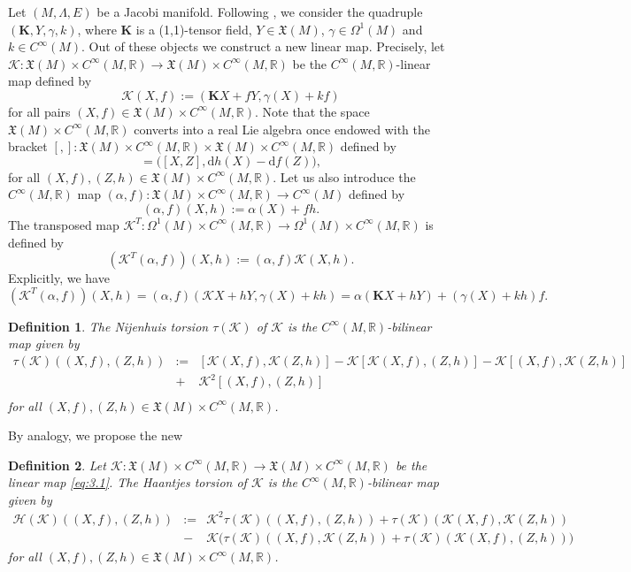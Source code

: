 \documentclass[10pt]{amsart}
\numberwithin{equation}{section}
\newcommand{\beq}{\begin{equation}}
\newcommand{\eeq}{\end{equation}}
\newcommand{\bea}{\begin{eqnarray}}
\newcommand{\eea}{\end{eqnarray}}
\newcommand{\nn}{\nonumber}
\newcommand{\rd}{\mathrm{d}}
\newcommand{\bs}{\boldsymbol}
\newcommand{\cH}{\mathcal{H}}
\newtheorem{definition}{Definition}
\theoremstyle{definition}
\begin{document}
\vspace{2mm}
Let $(M, \Lambda, E)$ be a Jacobi manifold. Following \cite{PNJGP2003}, we consider the quadruple $(\bs{K}, Y, \gamma, k)$, where $\bs{K}$ is a (1,1)-tensor field, $Y\in \mathfrak{X}(M)$, $\gamma\in \Omega^1(M)$ and $k\in C^{\infty}(M)$. Out of these objects we construct a new linear map. Precisely, let $\bs{\mathcal{K}}: \mathfrak{X}(M)\times C^{\infty}(M, \mathbb{R})\to \mathfrak{X}(M)\times C^{\infty}(M, \mathbb{R})$ be the $C^{\infty}(M, \mathbb{R})$-linear map defined by
\beq \label{eq:3.1}
\bs{\mathcal{K}}(X,f):= (\bs{K}X+fY, \gamma(X) +kf)
\eeq
for all pairs $(X,f)\in \mathfrak{X}(M) \times C^{\infty}(M, \mathbb{R})$.  Note that the space $\mathfrak{X}(M)\times C^{\infty}(M, \mathbb{R})$ converts into a real Lie algebra once endowed with the bracket
$[,]: \mathfrak{X}(M)\times C^{\infty}(M, \mathbb{R}) \times \mathfrak{X}(M)\times C^{\infty}(M, \mathbb{R})$ defined by
\beq
[(X,f),(Z,h)]= \big([X,Z], \rd h(X) - \rd f(Z)\big),
\eeq
for all $(X,f), (Z,h)\in \mathfrak{X}(M)\times C^{\infty}(M, \mathbb{R})$.
Let us also introduce the $C^{\infty}(M, \mathbb{R})$ map $(\alpha, f): \mathfrak{X}(M) \times C^{\infty}(M, \mathbb{R})\to C^{\infty}(M)$ defined by
\beq
(\alpha, f)(X,h):= \alpha(X)+ fh.
\eeq
The  transposed map
$\bs{\mathcal{K}}^{T}: \Omega^{1}(M) \times C^{\infty}(M, \mathbb{R})\to  \Omega^{1}(M) \times C^{\infty}(M, \mathbb{R})$ is defined by
\beq
(\bs{\mathcal{K}}^{T}(\alpha, f))(X,h):= (\alpha, f) \bs{\mathcal{K}}(X,h).
\eeq
Explicitly, we have
\beq
(\bs{\mathcal{K}}^{T}(\alpha, f))(X,h)=(\alpha, f)(\bs{\mathcal{K}} X+ hY, \gamma(X)+k h)=\alpha(\bs{K} X+hY)+(\gamma(X)+kh) f.
\eeq
\begin{definition}\cite{MMPCRAS1999}
The Nijenhuis torsion $\tau(\bs{\mathcal{K}})$ of $\bs{\mathcal{K}}$ is the $C^{\infty}(M, \mathbb{R})$-bilinear map given by
\bea
\nn \tau(\bs{\mathcal{K}}) ((X,f),(Z,h))&:=&[\bs{\mathcal{K}}(X,f), \bs{\mathcal{K}}(Z,h)]- \bs{\mathcal{K}} [\bs{\mathcal{K}}(X,f), (Z,h)]- \bs{\mathcal{K}} [(X,f), \bs{\mathcal{K}}(Z,h)]\\ \nn &+& \bs{\mathcal{K}}^2 [(X,f), (Z,h)]\\
\eea
for all $(X,f), (Z,h)\in \mathfrak{X}(M)\times C^{\infty}(M, \mathbb{R})$.
\end{definition}
By analogy, we propose the new
\begin{definition}
Let $\bs{\mathcal{K}}: \mathfrak{X}(M)\times C^{\infty}(M, \mathbb{R})\to \mathfrak{X}(M)\times C^{\infty}(M, \mathbb{R})$ be the linear map \eqref{eq:3.1}. The Haantjes torsion of $\bs{\mathcal{K}}$ is the $C^{\infty}(M, \mathbb{R})$-bilinear map given by
\bea
\nn \cH(\bs{\mathcal{K}}) ((X,f),(Z,h))&:=&\bs{\mathcal{K}}^{2}\tau(\bs{\mathcal{K}})((X,f),(Z,h))+\tau(\bs{\mathcal{K}})(\bs{\mathcal{K}}(X,f),\bs{\mathcal{K}}(Z,h))\\
&-& \bs{\mathcal{K}} \big(\tau(\bs{\mathcal{K}})((X,f),\bs{\mathcal{K}}(Z,h))+\tau(\bs{\mathcal{K}})(\bs{\mathcal{K}}(X,f),(Z,h))\big)
\eea
for all $(X,f),(Z,h)\in \mathfrak{X}(M)\times C^{\infty}(M, \mathbb{R})$.
\end{definition}
\end{document}
